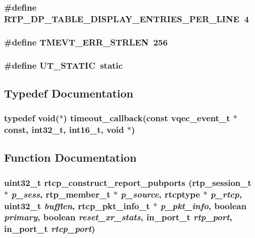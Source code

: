 \subsubsection{\setlength{\rightskip}{0pt plus 5cm}\#define RTP\_\-DP\_\-TABLE\_\-DISPLAY\_\-ENTRIES\_\-PER\_\-LINE~4}\label{vqec__rtp_8c_caea5579b8f1828221f47fe1a9801dcc}


\subsubsection{\setlength{\rightskip}{0pt plus 5cm}\#define TMEVT\_\-ERR\_\-STRLEN~256}\label{vqec__rtp_8c_8ccfad19303808619e728ec008600a39}


\subsubsection{\setlength{\rightskip}{0pt plus 5cm}\#define UT\_\-STATIC~static}\label{vqec__rtp_8c_840be0a802b42af3ce4430a7173caa40}




\subsection{Typedef Documentation}
\subsubsection{\setlength{\rightskip}{0pt plus 5cm}typedef void($\ast$) \bf{timeout\_\-callback}(const vqec\_\-event\_\-t $\ast$const, int32\_\-t, int16\_\-t, void $\ast$)}\label{vqec__rtp_8c_e8d1e2d0f723184044fdf44e2d398121}




\subsection{Function Documentation}
\subsubsection{\setlength{\rightskip}{0pt plus 5cm}uint32\_\-t rtcp\_\-construct\_\-report\_\-pubports (rtp\_\-session\_\-t $\ast$ {\em p\_\-sess}, rtp\_\-member\_\-t $\ast$ {\em p\_\-source}, rtcptype $\ast$ {\em p\_\-rtcp}, uint32\_\-t {\em bufflen}, rtcp\_\-pkt\_\-info\_\-t $\ast$ {\em p\_\-pkt\_\-info}, boolean {\em primary}, boolean {\em reset\_\-xr\_\-stats}, in\_\-port\_\-t {\em rtp\_\-port}, in\_\-port\_\-t {\em rtcp\_\-port})}\label{vqec__rtp_8c_a3b35e0f9039796566fd84aed604c932}


